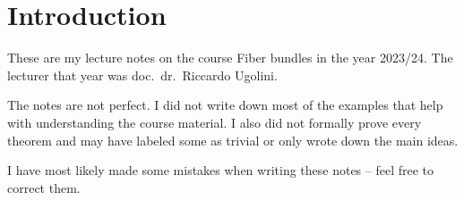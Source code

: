 \section*{Introduction}

These are my lecture notes on the course Fiber bundles in the
year 2023/24. The lecturer that year was doc.~dr.~Riccardo Ugolini.

The notes are not perfect. I did not write down most of the examples
that help with understanding the course material. I also did not
formally prove every theorem and may have labeled some as trivial or
only wrote down the main ideas.

I have most likely made some mistakes when writing these notes --
feel free to correct them.
